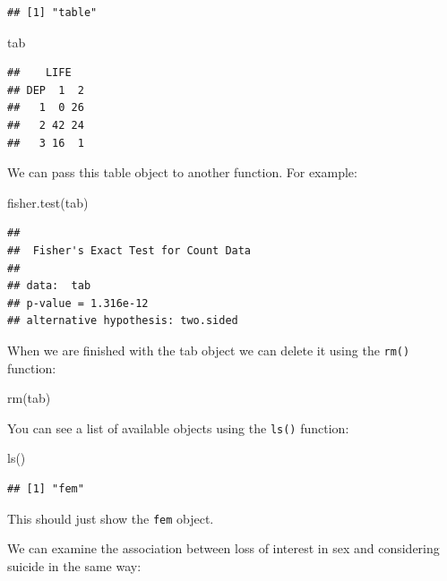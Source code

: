 \documentclass[
  12pt,
]{book}
\newenvironment{Shaded}{\begin{snugshade}}{\end{snugshade}}
\newcommand{\FunctionTok}[1]{\textcolor[rgb]{0.00,0.00,0.00}{#1}}
\newcommand{\NormalTok}[1]{#1}
\begin{document}
\begin{verbatim}
## [1] "table"
\end{verbatim}

\begin{Shaded}
\begin{Highlighting}[]
\NormalTok{tab}
\end{Highlighting}
\end{Shaded}

\begin{verbatim}
##    LIFE
## DEP  1  2
##   1  0 26
##   2 42 24
##   3 16  1
\end{verbatim}

We can pass this table object to another function. For example:

\begin{Shaded}
\begin{Highlighting}[]
\FunctionTok{fisher.test}\NormalTok{(tab)}
\end{Highlighting}
\end{Shaded}

\begin{verbatim}
## 
##  Fisher's Exact Test for Count Data
## 
## data:  tab
## p-value = 1.316e-12
## alternative hypothesis: two.sided
\end{verbatim}

When we are finished with the tab object we can delete it using the \texttt{rm()} function:

\begin{Shaded}
\begin{Highlighting}[]
\FunctionTok{rm}\NormalTok{(tab)}
\end{Highlighting}
\end{Shaded}

You can see a list of available objects using the \texttt{ls()} function:

\begin{Shaded}
\begin{Highlighting}[]
\FunctionTok{ls}\NormalTok{()}
\end{Highlighting}
\end{Shaded}

\begin{verbatim}
## [1] "fem"
\end{verbatim}

This should just show the \texttt{fem} object.

We can examine the association between loss of interest in sex and considering suicide in the same way:
\end{document}
